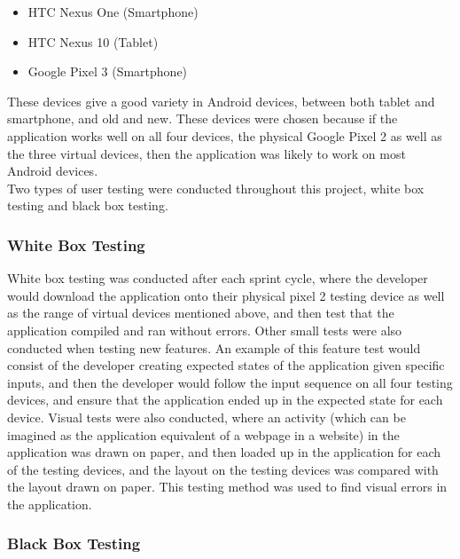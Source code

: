 \documentclass{article}
\begin{document}
\begin{itemize}
	\item HTC Nexus One (Smartphone)
	\item HTC Nexus 10 (Tablet)
	\item Google Pixel 3 (Smartphone)
\end{itemize}

These devices give a good variety in Android devices, between both tablet and smartphone, and old and new. These devices were chosen because if the application works well on all four devices, the physical Google Pixel 2 as well as the three virtual devices, then the application was likely to work on most Android devices. \\

Two types of user testing were conducted throughout this project, white box testing and black box testing. \\ 

\subsubsection{White Box Testing}

White box testing was conducted after each sprint cycle, where the developer would download the application onto their physical pixel 2 testing device as well as the range of virtual devices mentioned above, and then test that the application compiled and ran without errors. Other small tests were also conducted when testing new features. An example of this feature test would consist of the developer creating expected states of the application given specific inputs, and then the developer would follow the input sequence on all four testing devices, and ensure that the application ended up in the expected state for each device. Visual tests were also conducted, where an activity (which can be imagined as the application equivalent of a webpage in a website) in the application was drawn on paper, and then loaded up in the application for each of the testing devices, and the layout on the testing devices was compared with the layout drawn on paper. This testing method was used to find visual errors in the application. \\

\subsubsection{Black Box Testing}
\end{document}
